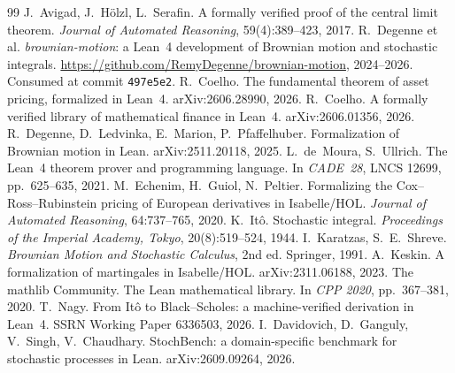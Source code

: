\documentclass[11pt]{article}
\begin{document}
\begin{thebibliography}{99}
\small
{} J.~Avigad, J.~H\"olzl, L.~Serafin. A formally verified proof of the central limit theorem.
  \emph{Journal of Automated Reasoning}, 59(4):389--423, 2017.
 R.~Degenne et al. \emph{brownian-motion}: a Lean~4 development of Brownian motion and stochastic
  integrals. \url{https://github.com/RemyDegenne/brownian-motion}, 2024--2026. Consumed at commit \texttt{497e5e2}.
 R.~Coelho. The fundamental theorem of asset pricing, formalized in Lean~4. arXiv:2606.28990, 2026.
 R.~Coelho. A formally verified library of mathematical finance in Lean~4. arXiv:2606.01356, 2026.
 R.~Degenne, D.~Ledvinka, E.~Marion, P.~Pfaffelhuber. Formalization of Brownian motion in Lean.
  arXiv:2511.20118, 2025.
 L.~de~Moura, S.~Ullrich. The Lean~4 theorem prover and programming language. In \emph{CADE~28},
  LNCS 12699, pp.~625--635, 2021.
 M.~Echenim, H.~Guiol, N.~Peltier. Formalizing the Cox--Ross--Rubinstein pricing of European
  derivatives in Isabelle/HOL. \emph{Journal of Automated Reasoning}, 64:737--765, 2020.
 K.~It\^o. Stochastic integral. \emph{Proceedings of the Imperial Academy, Tokyo}, 20(8):519--524, 1944.
 I.~Karatzas, S.~E.~Shreve. \emph{Brownian Motion and Stochastic Calculus}, 2nd ed. Springer, 1991.
 A.~Keskin. A formalization of martingales in Isabelle/HOL. arXiv:2311.06188, 2023.
 The mathlib Community. The Lean mathematical library. In \emph{CPP 2020}, pp.~367--381, 2020.
 T.~Nagy. From It\^o to Black--Scholes: a machine-verified derivation in Lean~4. SSRN Working Paper 6336503,
  2026.
 I.~Davidovich, D.~Ganguly, V.~Singh, V.~Chaudhary. StochBench: a domain-specific benchmark for
  stochastic processes in Lean. arXiv:2609.09264, 2026.
\end{thebibliography}
\end{document}

